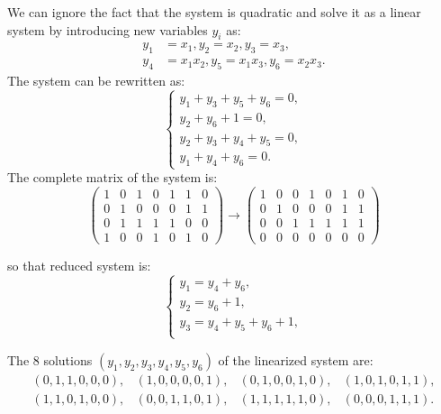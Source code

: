 \noindent
We can ignore the fact that the system is quadratic and solve it as a linear system by introducing new variables $y_i$ as:
\begin{align*}
    y_1 &= x_1, y_2 = x_2, y_3 = x_3, \\
    y_4 &= x_1x_2, y_5 = x_1x_3, y_6 = x_2x_3.
\end{align*}
The system can be rewritten as:
\begin{equation*}
    \left\{
    \begin{array}{l}
       y_1 + y_3 + y_5 + y_6 = 0, \\
       y_2 + y_6 + 1 = 0, \\
       y_2 + y_3 + y_4 + y_5 = 0, \\
       y_1 + y_4 + y_6 = 0.
    \end{array}
    \right.
\end{equation*}
\noindent
The complete matrix of the system is:
\[
\left(
\begin{array}{cccccc|c}
1 & 0 & 1 & 0 & 1 & 1 & 0 \\
0 & 1 & 0 & 0 & 0 & 1 & 1 \\
0 & 1 & 1 & 1 & 1 & 0 & 0 \\
1 & 0 & 0 & 1 & 0 & 1 & 0
\end{array}
\right)
\longrightarrow
\left(
\begin{array}{cccccc|c}
1 & 0 & 0 & 1 & 0 & 1 & 0 \\
0 & 1 & 0 & 0 & 0 & 1 & 1 \\
0 & 0 & 1 & 1 & 1 & 1 & 1 \\
0 & 0 & 0 & 0 & 0 & 0 & 0
\end{array}
\right)
\]

\noindent
so that reduced system is:
\begin{equation*}
    \left\{
    \begin{array}{l}
       y_1 =  y_4 + y_6, \\
       y_2 = y_6 + 1, \\
       y_3 = y_4 + y_5 + y_6 + 1, \\
\end{array}
    \right.
\end{equation*}
\vspace{0.4 cm}

\noindent
The 8 solutions $(y_1,y_2,y_3,y_4,y_5,y_6)$ of the linearized system are:
\[
\begin{array}{cccc}
(0,1,1,0,0,0), &
(1,0,0,0,0,1), &
(0,1,0,0,1,0), &
(1,0,1,0,1,1), \\[4pt]
(1,1,0,1,0,0), &
(0,0,1,1,0,1), &
(1,1,1,1,1,0), &
(0,0,0,1,1,1).
\end{array}
\]
\medskip

